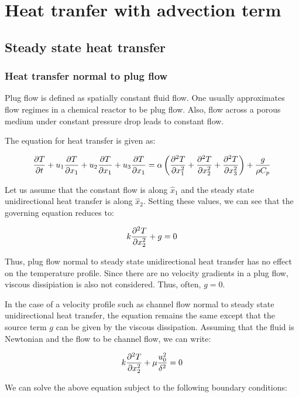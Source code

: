 \chapter{Heat tranfer with advection term}
\label{ch:convheat}

\section{Steady state heat transfer}

\subsection{Heat transfer normal to plug flow}

Plug flow is defined as spatially constant fluid flow. One usually approximates flow regimes in a chemical reactor to be plug flow. Also, flow across a porous medium under constant pressure drop leads to constant flow.


The equation for heat transfer is given as:

$$ {\partial T \over \partial t} + u_1 {\partial T \over \partial x_1} + u_2 {\partial T \over \partial x_1} + u_3 {\partial T \over \partial x_1} = \alpha \left({ \partial^2 T \over \partial x_1^2} + { \partial^2 T \over \partial x_2^2} + { \partial^2 T \over \partial x_3^2} \right) + {g \over \rho C_p}$$

Let us assume that the constant flow is along $\hat{x}_1$ and the steady state unidirectional heat transfer is along $\hat{x}_2$. Setting these values, we can see that the governing equation reduces to:

$$ k {\partial^2 T \over \partial x_2^2} + g = 0$$

Thus, plug flow normal to steady state unidirectional heat transfer has no effect on the temperature profile. Since there are no velocity gradients in a plug flow, viscous dissipiation is also not considered. Thus, often, $g=0$.

In the case of a velocity profile such as channel flow normal to steady state unidirectional heat transfer, the equation remains the same except that the source term $g$ can be given by the viscous dissipation. Assuming that the fluid is Newtonian and the flow to be channel flow, we can write:

$$ k {\partial^2 T \over \partial x_2^2} + \mu {u_0^2 \over \delta^2} = 0$$

We can solve the above equation subject to the following boundary conditions:

